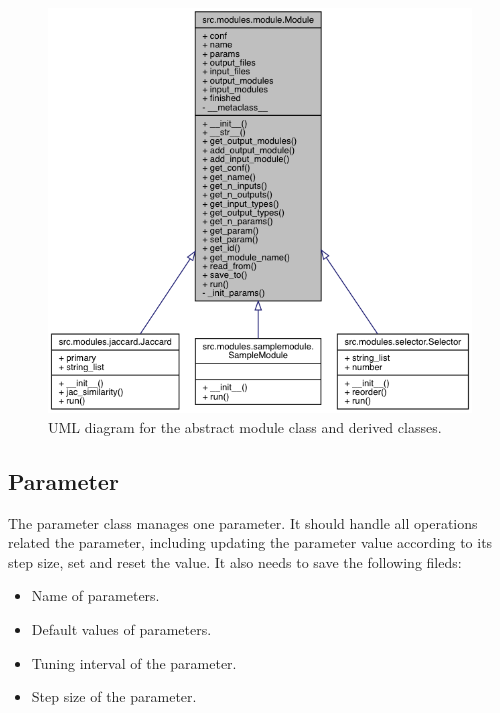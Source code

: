 \documentclass{article}
\begin{document}
    \begin{figure}[H]
        \begin{center}
            \includegraphics[width=\textwidth]{fig/module_uml.png}
        \end{center}
        \label{fig:module_uml}
        \caption{UML diagram for the abstract module class and derived classes.}
    \end{figure}

    \subsection{Parameter}
    The parameter class manages one parameter.
    It should handle all operations related the parameter,
    including updating the parameter value according to its step size,  set and reset the value.
    It also needs to save the following fileds:
    \begin{itemize}
        \item Name of parameters.
        \item Default values of parameters.
        \item Tuning interval of the parameter.
        \item Step size of the parameter.
    \end{itemize}
\end{document}
